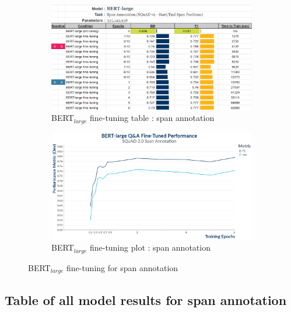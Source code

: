 \begin{figure}[!h]
	\centering
	\begin{subfigure}{0.95\textwidth}%
		\centering
		\includegraphics[width=\linewidth]{images/span/BERT_Large_Training.png}%
		\caption{BERT$_{large}$ fine-tuning table : span annotation}
	\end{subfigure}%
	
	\vspace*{8pt}%

	\begin{subfigure}{0.96\textwidth}%
		\centering
		\includegraphics[width=\linewidth]{images/QnA_BERT_Training_Performance_plot.png}%
		\caption{BERT$_{large}$ fine-tuning plot : span annotation}
	\end{subfigure}%
	\caption{\label{apdx:BERT_fine_tuning_span_annotation}BERT$_{large}$ fine-tuning for span annotation}
\end{figure}

\newpage
\subsection{Table of all model results for span annotation}
\label{apdx:span_annotation_all_results}

